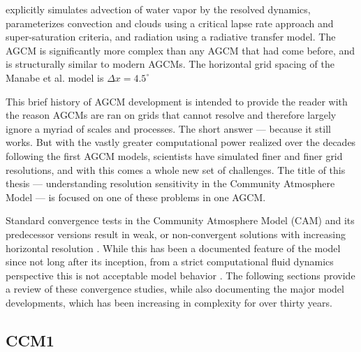 \cite{METAL1965MWR} explicitly simulates advection of water vapor by the resolved dynamics, parameterizes convection and clouds using a critical lapse rate approach and super-saturation criteria, and radiation using a radiative transfer model. The \cite{METAL1965MWR} AGCM is significantly more complex than any AGCM that had come before, and is structurally similar to modern AGCMs. The horizontal grid spacing of the Manabe et al. model is $\Delta x = 4.5^{\circ}$

This brief history of AGCM development is intended to provide the reader with the reason AGCMs are ran on grids that cannot resolve and therefore largely ignore a myriad of scales and processes. The short answer --- because it still works. But with the vastly greater computational power realized over the decades following the first AGCM models, scientists have simulated finer and finer grid resolutions, and with this comes a whole new set of challenges. The title of this thesis --- understanding resolution sensitivity in the Community Atmosphere Model --- is focused on one of these problems in one AGCM. 

Standard convergence tests in the Community Atmosphere Model (CAM) and its predecessor versions result in weak, or non-convergent solutions with increasing horizontal resolution \citep{KW1991JGR,WETAL1995CD,W1999T,W2008TELLUS,LETAL2011TELLUS,RJ2011MWR,RETAL2012ASL,OETAL2013JCLIM,RETAL2013JCLIM,ZetAl2014JCb,LETAL2015JCLIM}. While this has been a documented feature of the model since not long after its inception, from a strict computational fluid dynamics perspective this is not acceptable model behavior \citep{W2008TELLUS}. The following sections provide a review of these convergence studies, while also documenting the major model developments, which has been increasing in complexity for over thirty years.

\subsection{CCM1}

